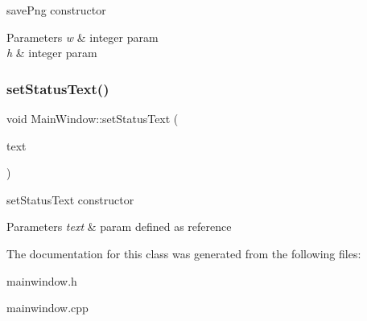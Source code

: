 save\+Png constructor 


\begin{DoxyParams}{Parameters}
{\em w} & integer param \\
\hline
{\em h} & integer param \\
\hline
\end{DoxyParams}
\mbox{\label{classMainWindow_aadb538c3401816b2c6038696ca0f8628}} 
\subsubsection{\texorpdfstring{set\+Status\+Text()}{setStatusText()}}
{\footnotesize\ttfamily void Main\+Window\+::set\+Status\+Text (\begin{DoxyParamCaption}\item[{Q\+String \&}]{text }\end{DoxyParamCaption})}



set\+Status\+Text constructor 


\begin{DoxyParams}{Parameters}
{\em text} & param defined as reference \\
\hline
\end{DoxyParams}


The documentation for this class was generated from the following files\+:\begin{DoxyCompactItemize}
\item 
mainwindow.\+h\item 
mainwindow.\+cpp\end{DoxyCompactItemize}
